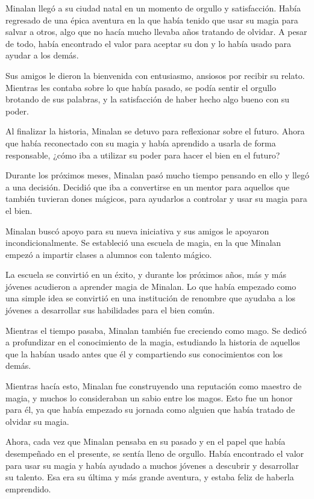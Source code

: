 

Minalan llegó a su ciudad natal en un momento de orgullo y satisfacción. Había regresado de una épica aventura en la que había tenido que usar su magia para salvar a otros, algo que no hacía mucho llevaba años tratando de olvidar. A pesar de todo, había encontrado el valor para aceptar su don y lo había usado para ayudar a los demás.

Sus amigos le dieron la bienvenida con entusiasmo, ansiosos por recibir su relato. Mientras les contaba sobre lo que había pasado, se podía sentir el orgullo brotando de sus palabras, y la satisfacción de haber hecho algo bueno con su poder.

Al finalizar la historia, Minalan se detuvo para reflexionar sobre el futuro. Ahora que había reconectado con su magia y había aprendido a usarla de forma responsable, ¿cómo iba a utilizar su poder para hacer el bien en el futuro?

Durante los próximos meses, Minalan pasó mucho tiempo pensando en ello y llegó a una decisión. Decidió que iba a convertirse en un mentor para aquellos que también tuvieran dones mágicos, para ayudarlos a controlar y usar su magia para el bien.

Minalan buscó apoyo para su nueva iniciativa y sus amigos le apoyaron incondicionalmente. Se estableció una escuela de magia, en la que Minalan empezó a impartir clases a alumnos con talento mágico.

La escuela se convirtió en un éxito, y durante los próximos años, más y más jóvenes acudieron a aprender magia de Minalan. Lo que había empezado como una simple idea se convirtió en una institución de renombre que ayudaba a los jóvenes a desarrollar sus habilidades para el bien común.

Mientras el tiempo pasaba, Minalan también fue creciendo como mago. Se dedicó a profundizar en el conocimiento de la magia, estudiando la historia de aquellos que la habían usado antes que él y compartiendo sus conocimientos con los demás.

Mientras hacía esto, Minalan fue construyendo una reputación como maestro de magia, y muchos lo consideraban un sabio entre los magos. Esto fue un honor para él, ya que había empezado su jornada como alguien que había tratado de olvidar su magia.

Ahora, cada vez que Minalan pensaba en su pasado y en el papel que había desempeñado en el presente, se sentía lleno de orgullo. Había encontrado el valor para usar su magia y había ayudado a muchos jóvenes a descubrir y desarrollar su talento. Esa era su última y más grande aventura, y estaba feliz de haberla emprendido.